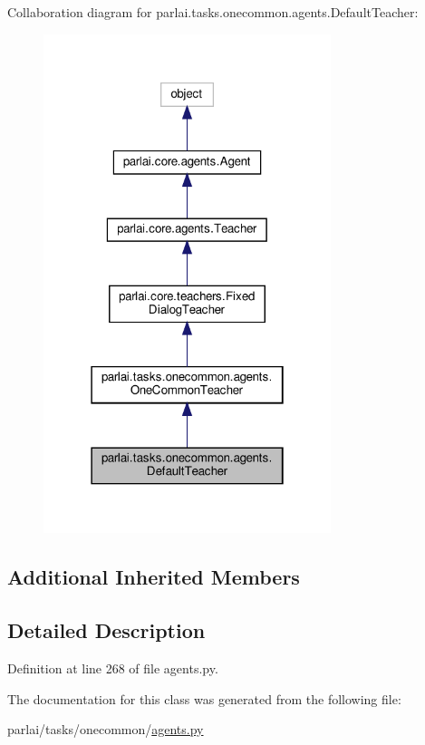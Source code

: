 Collaboration diagram for parlai.\+tasks.\+onecommon.\+agents.\+Default\+Teacher\+:
\nopagebreak
\begin{figure}[H]
\begin{center}
\leavevmode
\includegraphics[width=238pt]{df/d15/classparlai_1_1tasks_1_1onecommon_1_1agents_1_1DefaultTeacher__coll__graph}
\end{center}
\end{figure}
\subsection*{Additional Inherited Members}


\subsection{Detailed Description}


Definition at line 268 of file agents.\+py.



The documentation for this class was generated from the following file\+:\begin{DoxyCompactItemize}
\item 
parlai/tasks/onecommon/\hyperlink{parlai_2tasks_2onecommon_2agents_8py}{agents.\+py}\end{DoxyCompactItemize}
